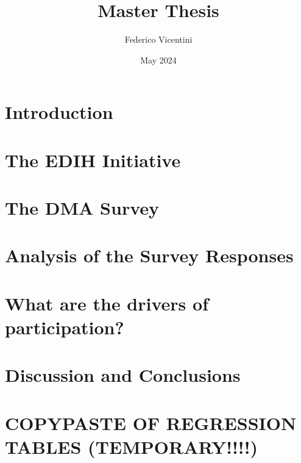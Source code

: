 \documentclass{article}
\title{Master Thesis}
\author{Federico Vicentini}
\date{May 2024}
\begin{document}
\maketitle

\tableofcontents


\newpage
\section{Introduction}


\newpage
\section{The EDIH Initiative}

\newpage
\section{The DMA Survey}

\newpage
\section{Analysis of the Survey Responses}

\newpage
\section{What are the drivers of participation?}

\newpage
\section{Discussion and Conclusions}


\newpage
\section{COPYPASTE OF REGRESSION TABLES (TEMPORARY!!!!)}
\end{document}
